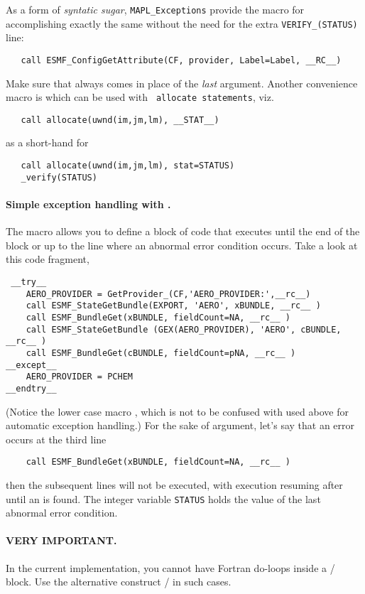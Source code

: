 As a form of {\em syntatic sugar}, {\tt MAPL\_Exceptions} provide the
macro  for accomplishing exactly the same without the need for
the extra {\tt VERIFY\_(STATUS)} line:
\begin{verbatim}
   call ESMF_ConfigGetAttribute(CF, provider, Label=Label, __RC__)
\end{verbatim}
Make sure that  always comes in place of the {\em last} argument.
Another convenience macro is  which can be used with {\tt
  allocate statements}, viz.
\begin{verbatim}
   call allocate(uwnd(im,jm,lm), __STAT__)
\end{verbatim}
as a short-hand for
\begin{verbatim}
   call allocate(uwnd(im,jm,lm), stat=STATUS)
   _verify(STATUS)
\end{verbatim}



\paragraph{Simple exception handling with . }

The  macro allows you to define a block of code that executes
until the end of the block or up to the line where an abnormal error
condition occurs. Take a look at this code fragment,
\begin{verbatim}
 __try__
    AERO_PROVIDER = GetProvider_(CF,'AERO_PROVIDER:',__rc__)
    call ESMF_StateGetBundle(EXPORT, 'AERO', xBUNDLE, __rc__ )
    call ESMF_BundleGet(xBUNDLE, fieldCount=NA, __rc__ )
    call ESMF_StateGetBundle (GEX(AERO_PROVIDER), 'AERO', cBUNDLE, __rc__ )
    call ESMF_BundleGet(cBUNDLE, fieldCount=pNA, __rc__ )
__except__
    AERO_PROVIDER = PCHEM
__endtry__
\end{verbatim}
(Notice the lower case macro , which is not to be confused with
 used above for automatic exception handling.) For the sake of
argument, let's say that an error occurs at the third line
\begin{verbatim}
    call ESMF_BundleGet(xBUNDLE, fieldCount=NA, __rc__ )
\end{verbatim}
then the subsequent lines will not be executed, with execution
resuming after  until an  is found. The integer
variable {\tt STATUS} holds the value of the last abnormal error condition.

\paragraph{VERY IMPORTANT.} In the current implementation, you cannot
have Fortran do-loops inside a / block. Use the
alternative construct / in such cases.

